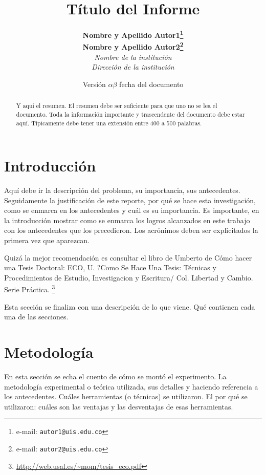 \documentclass[notitlepage,letterpaper,12pt]{article} %
\begin{document}
\title{Título del Informe}
\author{
\textbf{Nombre y Apellido Autor1\thanks{e-mail: \texttt{autor1@uis.edu.co}}}\\
\textbf{Nombre y Apellido Autor2\thanks{e-mail: \texttt{autor2@uis.edu.co}}}\\
\textit{Nombre de la institución}\\
\textit{Dirección de la institución}\\
} %

\date{Versión $\alpha \beta$ fecha del documento}
\maketitle %
\tableofcontents %

\begin{abstract}
Y aquí el resumen. El resumen debe ser suficiente para que uno no se lea el documento. Toda la información importante y trascendente del documento debe estar aquí. Típicamente debe tener una extensión entre 400 a 500 palabras.
\end{abstract}

\section{Introducción}

Aquí debe ir la descripción del problema, su importancia, sus antecedentes. Seguidamente la justificación de este reporte, por qué se hace esta investigación, como se enmarca en los antecedentes y cuál es su importancia. Es importante, en la introducción mostrar como se enmarca los logros alcanzados en este trabajo con los antecedentes que los precedieron. Los acrónimos deben ser explicitados la primera vez que aparezcan.

Quizá la mejor recomendación es consultar el libro de Umberto de Cómo hacer una Tesis Doctoral: ECO, U. ?Como Se Hace Una Tesis: Técnicas y Procedimientos de Estudio, Investigacion y Escritura/  Col. Libertad y Cambio. Serie Práctica. \footnote{\url{http://web.usal.es/~mom/tesis_eco.pdf}}


Esta sección se finaliza con una descripción de lo que viene. Qué contienen cada una de las secciones.

\section{Metodología}
En esta sección se echa el cuento de cómo se montó el experimento. La metodología experimental o teórica utilizada, sus detalles y haciendo referencia a los antecedentes. Cuáles herramientas (o técnicas) se utilizaron. El por qué se utilizaron: cuáles son las ventajas y las desventajas de esas herramientas.
\end{document}
